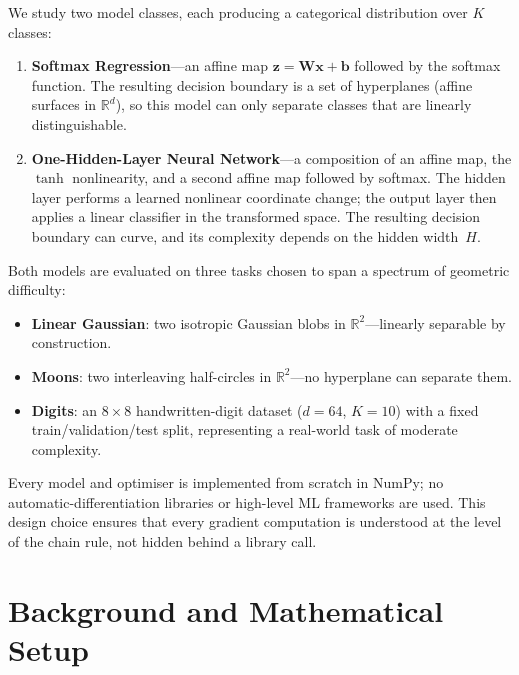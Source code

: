 \documentclass[11pt]{article}
\newcommand{\R}{\mathbb{R}}
\newcommand{\bx}{\mathbf{x}}
\newcommand{\bz}{\mathbf{z}}
\newcommand{\bW}{\mathbf{W}}
\newcommand{\bb}{\mathbf{b}}
\begin{document}
We study two model classes, each producing a categorical distribution over $K$ classes:
\begin{enumerate}[label=(\roman*),leftmargin=2em,itemsep=0.15em]
  \item \textbf{Softmax Regression}---an affine map $\bz = \bW\bx + \bb$ followed by the
        softmax function.  The resulting decision boundary is a set of hyperplanes
        (affine surfaces in $\R^d$), so this model can only separate classes that are
        linearly distinguishable.
  \item \textbf{One-Hidden-Layer Neural Network}---a composition of an affine map, the
        $\tanh$ nonlinearity, and a second affine map followed by softmax.  The hidden layer
        performs a learned nonlinear coordinate change; the output layer then applies a linear
        classifier in the transformed space.  The resulting decision boundary can curve,
        and its complexity depends on the hidden width~$H$.
\end{enumerate}

Both models are evaluated on three tasks chosen to span a spectrum of geometric difficulty:
\begin{itemize}[leftmargin=1.4em,itemsep=0.15em]
  \item \textbf{Linear Gaussian}: two isotropic Gaussian blobs in $\R^2$---linearly separable
        by construction.
  \item \textbf{Moons}: two interleaving half-circles in $\R^2$---no hyperplane can separate
        them.
  \item \textbf{Digits}: an $8{\times}8$ handwritten-digit dataset ($d{=}64$, $K{=}10$) with a
        fixed train/validation/test split, representing a real-world task of moderate complexity.
\end{itemize}

Every model and optimiser is implemented from scratch in NumPy; no automatic-differentiation
libraries or high-level ML frameworks are used.  This design choice ensures that every gradient
computation is understood at the level of the chain rule, not hidden behind a library call.

\section{Background and Mathematical Setup}
\label{sec:background}
\end{document}
